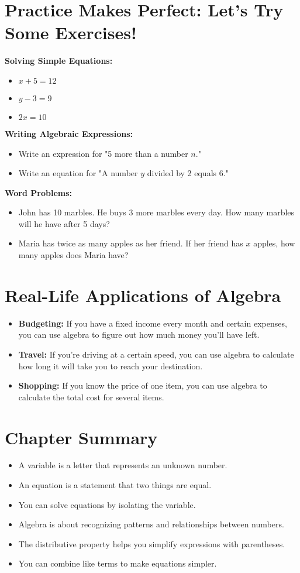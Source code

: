 \section{Practice Makes Perfect: Let’s Try Some Exercises!}
\textbf{Solving Simple Equations:}
\begin{itemize}
    \item $x + 5 = 12$
    \item $y - 3 = 9$
    \item $2x = 10$
\end{itemize}

\textbf{Writing Algebraic Expressions:}
\begin{itemize}
    \item Write an expression for "5 more than a number $n$."
    \item Write an equation for "A number $y$ divided by 2 equals 6."
\end{itemize}

\textbf{Word Problems:}
\begin{itemize}
    \item John has 10 marbles. He buys 3 more marbles every day. How many marbles will he have after 5 days?
    \item Maria has twice as many apples as her friend. If her friend has $x$ apples, how many apples does Maria have?
\end{itemize}

\section{Real-Life Applications of Algebra}
\begin{itemize}
    \item \textbf{Budgeting:} If you have a fixed income every month and certain expenses, you can use algebra to figure out how much money you'll have left.
    \item \textbf{Travel:} If you’re driving at a certain speed, you can use algebra to calculate how long it will take you to reach your destination.
    \item \textbf{Shopping:} If you know the price of one item, you can use algebra to calculate the total cost for several items.
\end{itemize}

\section{Chapter Summary}
\begin{itemize}
    \item A variable is a letter that represents an unknown number.
    \item An equation is a statement that two things are equal.
    \item You can solve equations by isolating the variable.
    \item Algebra is about recognizing patterns and relationships between numbers.
    \item The distributive property helps you simplify expressions with parentheses.
    \item You can combine like terms to make equations simpler.
\end{itemize}

